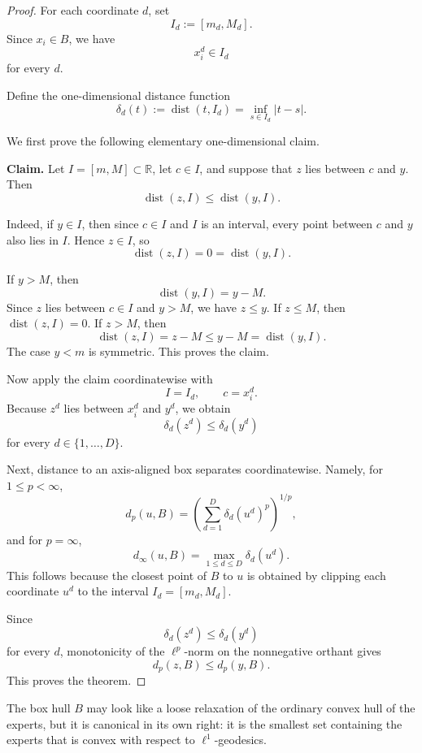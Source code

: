\documentclass[11pt]{article}
\begin{document}
\begin{proof}
For each coordinate \(d\), set
\[
I_d:=[m_d,M_d].
\]
Since \(x_i\in B\), we have
\[
x_i^d\in I_d
\]
for every \(d\).

Define the one-dimensional distance function
\[
\delta_d(t):=\operatorname{dist}(t,I_d)
=
\inf_{s\in I_d}|t-s|.
\]

We first prove the following elementary one-dimensional claim.

\medskip

\noindent
\textbf{Claim.}
Let \(I=[m,M]\subset \mathbb{R}\), let \(c\in I\), and suppose that
\(z\) lies between \(c\) and \(y\). Then
\[
\operatorname{dist}(z,I)\le \operatorname{dist}(y,I).
\]

\medskip

\noindent
Indeed, if \(y\in I\), then since \(c\in I\) and \(I\) is an interval,
every point between \(c\) and \(y\) also lies in \(I\). Hence \(z\in I\), so
\[
\operatorname{dist}(z,I)=0=\operatorname{dist}(y,I).
\]

If \(y>M\), then
\[
\operatorname{dist}(y,I)=y-M.
\]
Since \(z\) lies between \(c\in I\) and \(y>M\), we have \(z\le y\). If
\(z\le M\), then \(\operatorname{dist}(z,I)=0\). If \(z>M\), then
\[
\operatorname{dist}(z,I)=z-M\le y-M=\operatorname{dist}(y,I).
\]
The case \(y<m\) is symmetric. This proves the claim.

\medskip

Now apply the claim coordinatewise with
\[
I=I_d,
\qquad
c=x_i^d.
\]
Because \(z^d\) lies between \(x_i^d\) and \(y^d\), we obtain
\[
\delta_d(z^d)\le \delta_d(y^d)
\]
for every \(d\in\{1,\dots,D\}\).

Next, distance to an axis-aligned box separates coordinatewise. Namely, for
\(1\le p<\infty\),
\[
d_p(u,B)
=
\left(
\sum_{d=1}^D \delta_d(u^d)^p
\right)^{1/p},
\]
and for \(p=\infty\),
\[
d_\infty(u,B)
=
\max_{1\le d\le D}\delta_d(u^d).
\]
This follows because the closest point of \(B\) to \(u\) is obtained by
clipping each coordinate \(u^d\) to the interval \(I_d=[m_d,M_d]\).

Since
\[
\delta_d(z^d)\le \delta_d(y^d)
\]
for every \(d\), monotonicity of the \(\ell^p\)-norm on the nonnegative
orthant gives
\[
d_p(z,B)\le d_p(y,B).
\]
This proves the theorem.
\end{proof}

The box hull \(B\) may look like a loose relaxation of the ordinary convex
hull of the experts, but it is canonical in its own right: it is the
smallest set containing the experts that is convex with respect to
\(\ell^1\)-geodesics.
\end{document}
